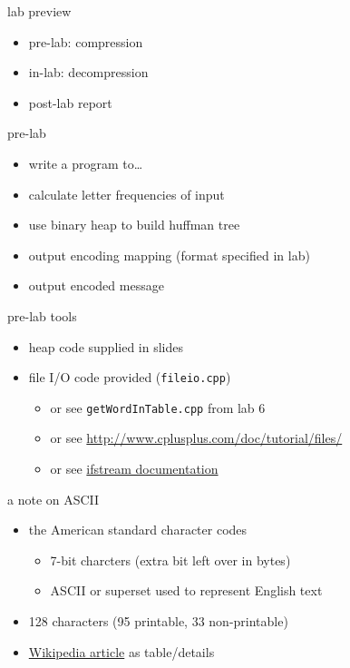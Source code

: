 \begin{frame}{lab preview}
\begin{itemize}
\item pre-lab: compression
\item in-lab: decompression
\item post-lab report
\end{itemize}
\end{frame}

\begin{frame}{pre-lab}
\begin{itemize}
\item write a program to\ldots
\vspace{.5cm}
\item calculate letter frequencies of input
\item use binary heap to build huffman tree
\item output encoding mapping (format specified in lab)
\item output encoded message
\end{itemize}
\end{frame}

\begin{frame}{pre-lab tools}
\begin{itemize}
\item heap code supplied in slides
\item file I/O code provided (\texttt{fileio.cpp})
\begin{itemize}
\item or see \texttt{getWordInTable.cpp} from lab 6
\item or see \url{http://www.cplusplus.com/doc/tutorial/files/}
\item or see \href{http://en.cppreference.com/w/cpp/io/basic_ifstream}{ifstream documentation}
\end{itemize}
\end{itemize}
\end{frame}

\begin{frame}{a note on ASCII}
\begin{itemize}
\item the American standard character codes
\begin{itemize}
\item 7-bit charcters (extra bit left over in bytes)
\item ASCII or superset used to represent English text
\end{itemize}
\item 128 characters (95 printable, 33 non-printable)
\item \href{https://en.wikipedia.org/wiki/ASCII}{Wikipedia article} as table/details
\end{itemize}
\end{frame}

